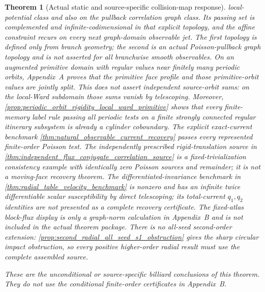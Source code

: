 \documentclass[11pt]{amsart}
\theoremstyle{compactplain}
\newtheorem{theorem}{Theorem}[section]
\theoremstyle{compactdefinition}
\theoremstyle{compactremark}
\begin{document}
\begin{theorem}[Actual static and source-specific collision-map response]
local-potential class and also on the pullback correlation graph class.  Its
passing set is complemented and infinite-codimensional in that explicit
topology, and the
affine constraint recurs on every next graph-domain observable jet.  The first
topology is defined only from branch geometry; the second is an actual
Poisson-pullback graph topology and is not asserted for all branchwise smooth
observables.  On an augmented primitive domain with regular values near
finitely many periodic orbits, Appendix~A proves that the primitive face
profile and those primitive-orbit values are jointly split.  This does not
assert independent source-orbit sums: on the local-Ward subdomain those sums
vanish by telescoping.
Moreover,
\cref{prop:periodic_orbit_rigidity_local_ward_primitive} shows that every
finite-memory label rule passing all periodic tests on a finite strongly
connected regular itinerary subsystem is already a cylinder coboundary.  The
explicit exact-current benchmark
\cref{thm:natural_observable_current_recovery} passes every represented
finite-order Poisson test.  The independently prescribed rigid-translation
source in \cref{thm:independent_flux_conjugate_correlation_source} is a
fixed-trivialization consistency example with identically zero Poisson
sources and remainder; it is not a moving-face recovery theorem.  The
differentiated-invariance benchmark in
\cref{thm:radial_table_velocity_benchmark} is nonzero and has an infinite
twice differentiable scalar susceptibility by direct telescoping; its
total-current \(q_1,q_2\) identities are not presented as a complete recovery
certificate.  The fixed-atlas block-flux display is only a graph-norm
calculation in Appendix~B and is not included in the actual theorem package.  There is no
all-seed second-order extension:
\cref{prop:second_radial_all_seed_s1_obstruction} gives the sharp circular
impact obstruction, so every positive higher-order radial result must use the
complete assembled source.

These are the unconditional or source-specific billiard conclusions of this
theorem.  They do not use the conditional finite-order certificates in
Appendix~B.
\end{theorem}
\end{document}
